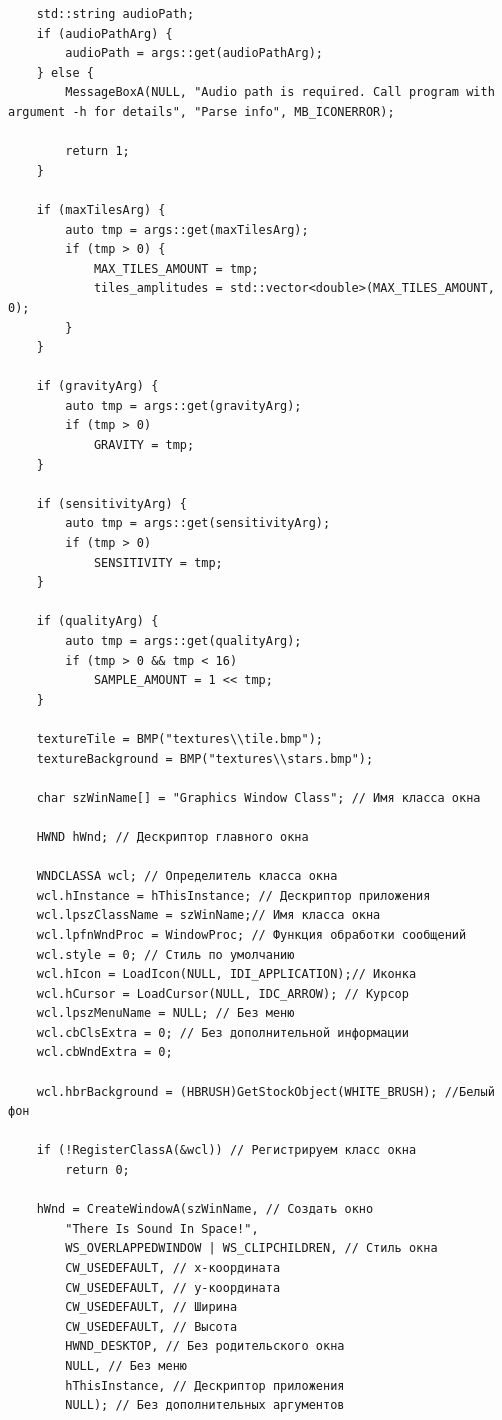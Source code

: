 \documentclass[a4paper,14pt]{extarticle}
\begin{document}
\begin{verbatim}
    std::string audioPath;
    if (audioPathArg) {
        audioPath = args::get(audioPathArg);
    } else {
        MessageBoxA(NULL, "Audio path is required. Call program with argument -h for details", "Parse info", MB_ICONERROR);

        return 1;
    }

    if (maxTilesArg) {
        auto tmp = args::get(maxTilesArg);
        if (tmp > 0) {
            MAX_TILES_AMOUNT = tmp;
            tiles_amplitudes = std::vector<double>(MAX_TILES_AMOUNT, 0);
        }
    }

    if (gravityArg) {
        auto tmp = args::get(gravityArg);
        if (tmp > 0)
            GRAVITY = tmp;
    }

    if (sensitivityArg) {
        auto tmp = args::get(sensitivityArg);
        if (tmp > 0)
            SENSITIVITY = tmp;
    }

    if (qualityArg) {
        auto tmp = args::get(qualityArg);
        if (tmp > 0 && tmp < 16)
            SAMPLE_AMOUNT = 1 << tmp;
    }

    textureTile = BMP("textures\\tile.bmp");
    textureBackground = BMP("textures\\stars.bmp");

    char szWinName[] = "Graphics Window Class"; // Имя класса окна

    HWND hWnd; // Дескриптор главного окна

    WNDCLASSA wcl; // Определитель класса окна
    wcl.hInstance = hThisInstance; // Дескриптор приложения
    wcl.lpszClassName = szWinName;// Имя класса окна
    wcl.lpfnWndProc = WindowProc; // Функция обработки сообщений
    wcl.style = 0; // Стиль по умолчанию
    wcl.hIcon = LoadIcon(NULL, IDI_APPLICATION);// Иконка
    wcl.hCursor = LoadCursor(NULL, IDC_ARROW); // Курсор
    wcl.lpszMenuName = NULL; // Без меню
    wcl.cbClsExtra = 0; // Без дополнительной информации
    wcl.cbWndExtra = 0;

    wcl.hbrBackground = (HBRUSH)GetStockObject(WHITE_BRUSH); //Белый фон

    if (!RegisterClassA(&wcl)) // Регистрируем класс окна
        return 0;

    hWnd = CreateWindowA(szWinName, // Создать окно
        "There Is Sound In Space!",
        WS_OVERLAPPEDWINDOW | WS_CLIPCHILDREN, // Стиль окна
        CW_USEDEFAULT, // x-координата
        CW_USEDEFAULT, // y-координата
        CW_USEDEFAULT, // Ширина
        CW_USEDEFAULT, // Высота
        HWND_DESKTOP, // Без родительского окна
        NULL, // Без меню
        hThisInstance, // Дескриптор приложения
        NULL); // Без дополнительных аргументов


\end{verbatim}
\end{document}
